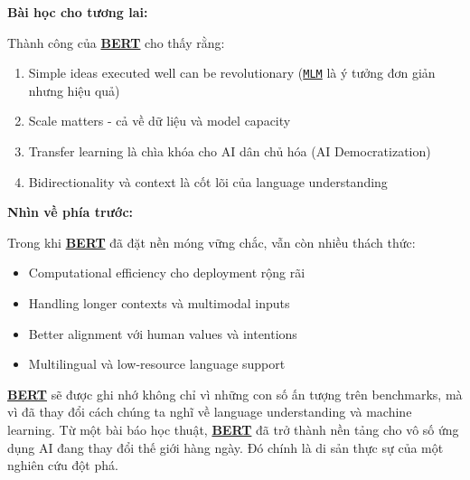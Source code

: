 \textbf{Bài học cho tương lai:}

Thành công của \hyperref[acro:bert]{\textbf{BERT}} cho thấy rằng:
\begin{enumerate}
    \item Simple ideas executed well can be revolutionary (\hyperref[acro:mlm]{\texttt{MLM}} là ý tưởng đơn giản nhưng hiệu quả)
    \item Scale matters - cả về dữ liệu và model capacity
    \item Transfer learning là chìa khóa cho AI dân chủ hóa (AI Democratization)
    \item Bidirectionality và context là cốt lõi của language understanding
\end{enumerate}

\textbf{Nhìn về phía trước:}

Trong khi \hyperref[acro:bert]{\textbf{BERT}} đã đặt nền móng vững chắc, vẫn còn nhiều thách thức:
\begin{itemize}
    \item Computational efficiency cho deployment rộng rãi
    \item Handling longer contexts và multimodal inputs
    \item Better alignment với human values và intentions
    \item Multilingual và low-resource language support
\end{itemize}

\hyperref[acro:bert]{\textbf{BERT}} sẽ được ghi nhớ không chỉ
vì những con số ấn tượng trên benchmarks, mà vì đã thay đổi cách chúng ta nghĩ về language understanding và machine learning.
Từ một bài báo học thuật, \hyperref[acro:bert]{\textbf{BERT}} đã trở thành nền tảng cho vô số ứng dụng AI đang thay đổi thế giới hàng ngày.
Đó chính là di sản thực sự của một nghiên cứu đột phá.